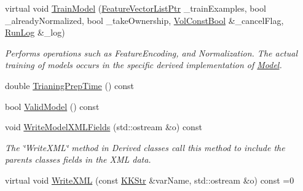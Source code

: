 \begin{DoxyCompactItemize}
$$virtual void \hyperlink{class_k_k_m_l_l_1_1_model_a1341c2cdd41a271e4b84ebf25838d389}{Train\+Model} (\hyperlink{namespace_k_k_m_l_l_acf2ba92a3cf03e2b19674b24ff488ef6}{Feature\+Vector\+List\+Ptr} \+\_\+train\+Examples, bool \+\_\+already\+Normalized, bool \+\_\+take\+Ownership, \hyperlink{namespace_k_k_b_a7d390f568e2831fb76b86b56c87bf92f}{Vol\+Const\+Bool} \&\+\_\+cancel\+Flag, \hyperlink{class_k_k_b_1_1_run_log}{Run\+Log} \&\+\_\+log)
\begin{DoxyCompactList}\small\item\em Performs operations such as Feature\+Encoding, and Normalization. The actual training of models occurs in the specific derived implementation of \textquotesingle{}\hyperlink{class_k_k_m_l_l_1_1_model}{Model}\textquotesingle{}. \end{DoxyCompactList}\item 
double \hyperlink{class_k_k_m_l_l_1_1_model_ab0dfdc11688a97bc0329f32a02540f93}{Trianing\+Prep\+Time} () const 
\item 
bool \hyperlink{class_k_k_m_l_l_1_1_model_aa9a1e4855c20e37b5245facd13276688}{Valid\+Model} () const 
\item 
void \hyperlink{class_k_k_m_l_l_1_1_model_a560829876c8ca002f00592e428a780a2}{Write\+Model\+X\+M\+L\+Fields} (std\+::ostream \&o) const 
\begin{DoxyCompactList}\small\item\em The \char`\"{}\+Write\+X\+M\+L\char`\"{} method in Derived classes call this method to include the parents classes fields in the X\+ML data. \end{DoxyCompactList}\item 
virtual void \hyperlink{class_k_k_m_l_l_1_1_model_aa6bd59246f77cf9de83c6684041c0127}{Write\+X\+ML} (const \hyperlink{class_k_k_b_1_1_k_k_str}{K\+K\+Str} \&var\+Name, std\+::ostream \&o) const  =0
\end{DoxyCompactItemize}
